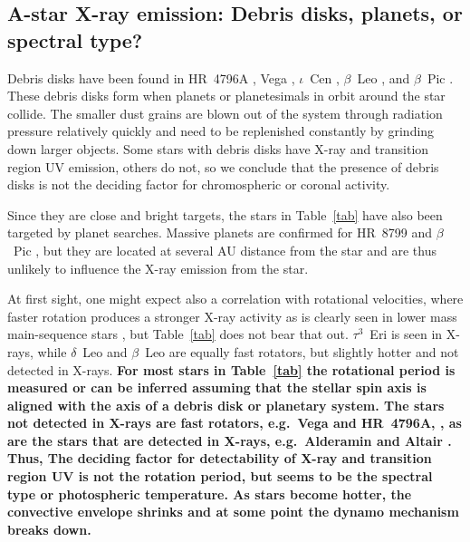 \documentclass[preprint2]{aastex631}
\begin{document}
\subsection{A-star  X-ray emission: Debris disks, planets, or spectral type?}
Debris disks have been found in 
HR~4796A \citep[e.g.][]{1991ApJ...383L..79J}, Vega
\citep[e.g.][]{2005ApJ...628..487S}, $\iota$~Cen
\citep[e.g.][]{2011ApJ...736L..32Q}, $\beta$~Leo  \citep[e.g.][]{2021AJ....161..186D}, and
$\beta$~Pic \citep[e.g.][]{2001MNRAS.323..402L}.  These debris disks
form when planets or planetesimals in orbit around the star
collide. The smaller dust grains are blown out of the system through
radiation pressure relatively quickly and need to be replenished
constantly by grinding down larger objects. 
Some stars with debris disks have X-ray and transition region UV emission, others do not, so we conclude that the presence of debris disks is not the deciding factor for chromospheric or coronal activity.

Since they are close and bright targets, the stars in Table~\ref{tab}
have also been targeted by planet searches. Massive planets are
confirmed for HR~8799 \citep{2008Sci...322.1348M} and $\beta$~Pic
\citep[e.g.][]{2021AJ....161..179B}, but they are located at several
AU distance from the star and are thus unlikely to influence the
X-ray emission from the star.

At first sight, one might expect also a correlation with rotational velocities, where faster rotation produces a stronger X-ray activity as is clearly seen in lower mass main-sequence stars \citep{2011ApJ...743...48W}, but Table~\ref{tab} does not bear that out. $\tau^3$~Eri is seen in X-rays, while $\delta$~Leo and $\beta$~Leo are equally fast rotators, but slightly hotter and not detected in X-rays. 
\textbf{For most stars in Table~\ref{tab} the rotational period is measured  or can be inferred assuming that the stellar spin axis is aligned with the axis of a debris disk or planetary system. The stars not detected in X-rays are fast rotators, e.g.\ Vega \citep[0.68~d for Vega][]{2015A&A...577A..64B} and HR~4796A,  \citep[0.5~d][]{2014ApJ...786..136D}, as are the stars that are detected in X-rays, e.g.\ Alderamin \citep[0.5~d][]{2006ApJ...637..494V} and Altair \citep[0.4~d][]{2006ApJ...636.1087P}. Thus,
The deciding factor for detectability of X-ray and transition region UV is not the rotation period, but seems to be the spectral type or photospheric temperature. As stars become hotter, the convective envelope shrinks and at some point the dynamo mechanism breaks down.}
\end{document}
